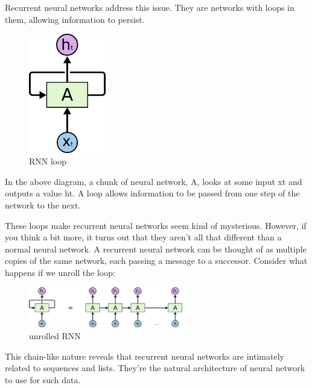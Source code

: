 {Recurrent neural networks address this issue. They are networks with loops in them, allowing information to persist.
\renewcommand{\figurename}{Abb.}
\begin{figure}[htp]
\centering
\includegraphics[width=0.30\textwidth]{pictures/RNN-rolled.png}
\caption[RNN Loop]{RNN loop\protect\footnotemark}
\end{figure}
In the above diagram, a chunk of neural network, A, looks at some input xt and outputs a value ht. A loop allows information to be passed from one step of the network to the next.

These loops make recurrent neural networks seem kind of mysterious. However, if you think a bit more, it turns out that they aren’t all that different than a normal neural network. A recurrent neural network can be thought of as multiple copies of the same network, each passing a message to a successor. Consider what happens if we unroll the loop:
\renewcommand{\figurename}{Abb.}
\begin{figure}[htp]
\centering
\includegraphics[width=0.60\textwidth]{pictures/RNN-unrolled.png}
\caption[unrolled RNN]{unrolled RNN\protect\footnotemark}
\end{figure}
This chain-like nature reveals that recurrent neural networks are intimately related to sequences and lists. They’re the natural architecture of neural network to use for such data.

}
